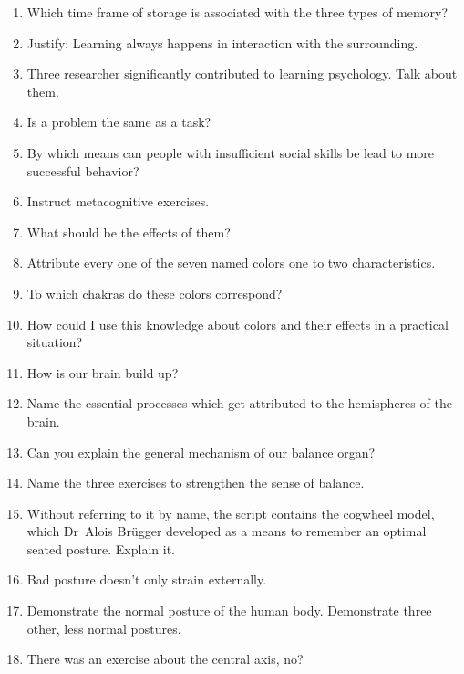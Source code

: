 \documentclass[../main.tex]{subfiles}
\begin{document}
\begin{enumerate}
      \vspace{4mm}
    \item Which time frame of storage is associated with the three types of memory?
          \vspace{4mm}
\item Justify: Learning always happens in interaction with the surrounding.
\item Three researcher significantly contributed to learning psychology. Talk about them.
      \vspace{4mm}
    \item Is a problem the same as a task?
          \vspace{4mm}
        \item By which means can people with insufficient social skills be lead to more successful behavior?
              \vspace{4mm}
\item Instruct metacognitive exercises.
\item What should be the effects of them?
      \vspace{4mm}
\item Attribute every one of the seven named colors one to two characteristics.
\item To which chakras do these colors correspond?
\item How could I use this knowledge about colors and their effects in a practical situation?
      \vspace{4mm}
  \item How is our brain build up?
  \item Name the essential processes which get attributed to the hemispheres of the brain.
        \vspace{4mm}
\item Can you explain the general mechanism of our balance organ?
\item Name the three exercises to strengthen the sense of balance.
      \vspace{4mm}
\item Without referring to it by name, the script contains the cogwheel model,
  which Dr~Alois Br\"ugger developed as a means to remember an optimal seated posture. Explain it.
\item Bad posture doesn't only strain externally.
\item Demonstrate the normal posture of the human body. Demonstrate three other, less normal postures.
      \vspace{4mm}
    \item There was an exercise about the central axis, no?

\end{enumerate}
\end{document}
